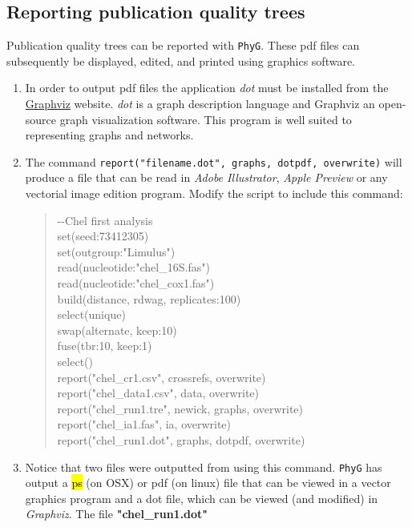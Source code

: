 \documentclass[11pt]{article}
\newcommand{\phyg}{\texttt{PhyG} }
\begin{document}
\subsection{Reporting publication quality trees}
\label{subsec:dotpdf}

Publication quality trees can be reported with \texttt{PhyG}. These pdf files can  
subsequently be displayed, edited, and printed using graphics software.

\begin{enumerate}

\item In order to output pdf files the application \textit{dot} must be installed from 
the \href{https://graphviz.org/download/}{Graphviz} website. \textit{dot} is a graph 
description language and Graphviz an  open-source graph visualization software. 
This program is well suited to representing graphs and networks.

\item  The command \texttt{report("filename.dot", graphs, dotpdf, overwrite)} will 
produce a file that can be read in \textit{Adobe Illustrator}, \textit{Apple Preview} 
or any vectorial image edition program. Modify the script to include this command:

	\begin{quote}
	-\/-Chel first analysis\\
	set(seed:73412305)\\
	set(outgroup:"Limulus")\\
	read(nucleotide:"chel\_16S.fas")\\
	read(nucleotide:"chel\_cox1.fas")\\
	build(distance, rdwag, replicates:100)\\
	select(unique)\\
	swap(alternate, keep:10)\\
	fuse(tbr:10, keep:1)\\
	select()\\
	report("chel\_cr1.csv", crossrefs, overwrite)\\
	report("chel\_data1.csv", data, overwrite)\\
	report("chel\_run1.tre", newick, graphs, overwrite)\\
	report("chel\_ia1.fas", ia, overwrite)\\
	report("chel\_run1.dot", graphs, dotpdf, overwrite)\\
	\end{quote}
	
\item Notice that two files were outputted from using this command. \phyg has 
output a \hl{ps} (on OSX) or pdf (on linux) file that can be viewed in a vector graphics program and a dot 
file, which can be viewed (and modified) in \textit{Graphviz}.
The file \textbf{"chel\_run1.dot"} 
\end{enumerate}
\end{document}

